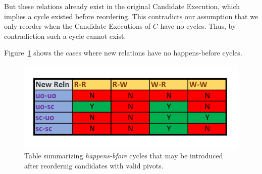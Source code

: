     But these relations already exist in the original Candidate Execution, which implies a cycle existed before reordering. This contradicts our assumption that we only reorder when the Candidate Executions of $C$ have no cycles. Thus, by contradiction such a cycle cannot exist.

    Figure~\ref{reord:cycle_table} shows the cases where new relations have no happens-before cycles. 
    \begin{figure}[H]
        \centering
        \includegraphics[scale=0.7]{5.InstructionReordering/4.ValidReorderingCandidate/ProofParts/Part3/part3_table.pdf}
        \caption{Table summarizing \textit{happens-bfore} cycles that may be introduced after reordernig candidates with valid pivots.}
        \label{reord:cycle_table}
    \end{figure}